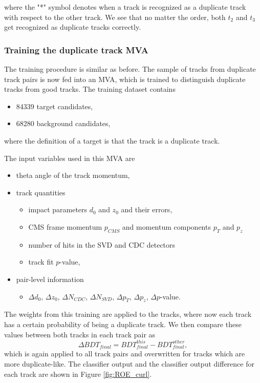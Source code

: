 where the "*" symbol denotes when a track is recognized as a duplicate track with respect to the other track. We see that no matter the order, both $t_2$ and $t_3$ get recognized as duplicate tracks correctly. %

\subsubsection{Training the duplicate track MVA}
The training procedure is similar as before. The sample of tracks from duplicate track pairs is now fed into an MVA, which is trained to distinguish duplicate tracks from good tracks. The training dataset contains
\begin{itemize}
	\item 84339 target candidates,
	\item 68280 background candidates,
\end{itemize}
where the definition of a target is that the track is a duplicate track. 

The input variables used in this MVA are
\begin{itemize}
	\item theta angle of the track momentum,
	\item track quantities
	\begin{itemize}
		\item impact parameters $d_0$ and $z_0$ and their errors,
		\item CMS frame momentum $p_{CMS}$ and momentum components $p_T$ and $p_z$ 
		\item number of hits in the SVD and CDC detectors
		\item track fit $p$-value,
	\end{itemize}
	\item pair-level information
	\begin{itemize}
		\item $\Delta d_0$, $\Delta z_0$, $\Delta N_{CDC}$, $\Delta N_{SVD}$, $\Delta p_T$, $\Delta p_z$, $\Delta p$-value.  
	\end{itemize}
\end{itemize}

The weights from this training are applied to the tracks, where now each track has a certain probability of being a duplicate track. We then compare these values between both tracks in each track pair as
\begin{equation}
\Delta BDT_{final} = BDT_{final}^{this} - BDT_{final}^{other},
\end{equation}
which is again applied to all track pairs and overwritten for tracks which are more duplicate-like. The classifier output and the classifier output difference for each track are shown in Figure \ref{fig:ROE_curl}. 


